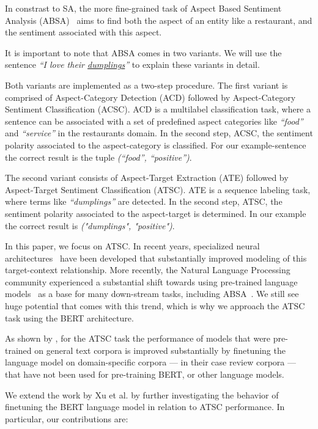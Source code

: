 \documentclass[11pt,a4paper]{article}
\begin{document}
In constrast to SA, the more fine-grained task of Aspect Based Sentiment Analysis (ABSA)~\cite{Hu2004, Pontiki2014} aims to find both the aspect of an entity like a restaurant, and the sentiment associated with this aspect.

It is important to note that ABSA comes in two variants. We will use the sentence \textit{``I love their \underline{dumplings}''} to explain these variants in detail.

Both variants are implemented as a two-step procedure. The first variant is comprised of Aspect-Category Detection (ACD) followed by Aspect-Category Sentiment Classification (ACSC).
ACD is a multilabel classification task, where a sentence can be associated with a set of predefined aspect categories like \textit{``food''} and \textit{``service''} in the restaurants domain.
In the second step, ACSC, the sentiment polarity associated to the aspect-category is classified. For our example-sentence the correct result is the tuple \textit{(``food'', ``positive'')}.

The second variant consists of Aspect-Target Extraction (ATE) followed by Aspect-Target Sentiment Classification (ATSC).
ATE is a sequence labeling task, where terms like \textit{``dumplings''} are detected. In the second step, ATSC, the sentiment polarity associated to the aspect-target is determined. In our example the correct result is \textit{("dumplings", "positive")}.

In this paper, we focus on ATSC. In recent years, specialized neural architectures~\cite{Tang2015, Tang2016} have been developed that substantially improved modeling of this target-context relationship.
More recently, the Natural Language Processing community experienced a substantial shift towards using pre-trained language models~\cite{Peters2018, Radford2018, Howard, Devlin2019} as a base for many down-stream tasks, including ABSA~\cite{ArxSong, Xu2019, Sun2019}.
We still see huge potential that comes with this trend, which is why we approach the ATSC task using the BERT architecture.

As shown by \citet{Xu2019}, for the ATSC task the performance of models that were pre-trained on general text corpora is improved substantially by finetuning the language model on domain-specific corpora --- in their case review corpora --- that have not been used for pre-training BERT, or other language models.

We extend the work by Xu et al. by further investigating the behavior of finetuning the BERT language model in relation to ATSC performance.
In particular, our contributions are:
\end{document}

